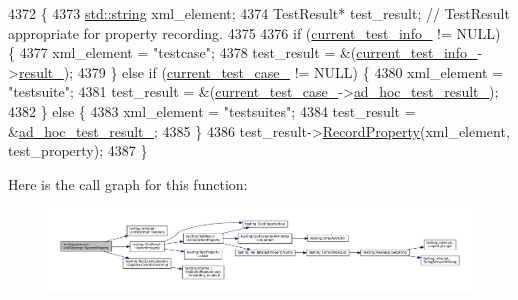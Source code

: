 \begin{DoxyCode}
4372                                                                    \{
4373   \hyperlink{namespacetesting_1_1internal_a8e8ff5b11e64078831112677156cb111}{std::string} xml\_element;
4374   TestResult* test\_result;  \textcolor{comment}{// TestResult appropriate for property recording.}
4375 
4376   \textcolor{keywordflow}{if} (\hyperlink{classtesting_1_1internal_1_1UnitTestImpl_a56128aac0fb5be45993715d1130b0610}{current\_test\_info\_} != NULL) \{
4377     xml\_element = \textcolor{stringliteral}{"testcase"};
4378     test\_result = &(\hyperlink{classtesting_1_1internal_1_1UnitTestImpl_a56128aac0fb5be45993715d1130b0610}{current\_test\_info\_}->\hyperlink{classtesting_1_1TestInfo_a108fd469897a8d4e5c4361947a5ed785}{result\_});
4379   \} \textcolor{keywordflow}{else} \textcolor{keywordflow}{if} (\hyperlink{classtesting_1_1internal_1_1UnitTestImpl_a3b346729d3940f065e05c69c434ebb3f}{current\_test\_case\_} != NULL) \{
4380     xml\_element = \textcolor{stringliteral}{"testsuite"};
4381     test\_result = &(\hyperlink{classtesting_1_1internal_1_1UnitTestImpl_a3b346729d3940f065e05c69c434ebb3f}{current\_test\_case\_}->\hyperlink{classtesting_1_1TestCase_a4aec85d3398a4a0161f1cde69c07aadc}{ad\_hoc\_test\_result\_});
4382   \} \textcolor{keywordflow}{else} \{
4383     xml\_element = \textcolor{stringliteral}{"testsuites"};
4384     test\_result = &\hyperlink{classtesting_1_1internal_1_1UnitTestImpl_a15355228a7140a08f9e2f333aa934ccd}{ad\_hoc\_test\_result\_};
4385   \}
4386   test\_result->\hyperlink{classtesting_1_1TestResult_ac253b0fd7ea70f457e9517e415eac32d}{RecordProperty}(xml\_element, test\_property);
4387 \}
\end{DoxyCode}
Here is the call graph for this function\+:
\nopagebreak
\begin{figure}[H]
\begin{center}
\leavevmode
\includegraphics[width=350pt]{classtesting_1_1internal_1_1UnitTestImpl_a15e4af4df167d2504decbc8fcc108a6f_cgraph}
\end{center}
\end{figure}
\mbox{\label{classtesting_1_1internal_1_1UnitTestImpl_af84d2515f1a272a8783f00a3e8c0aff8}} 
